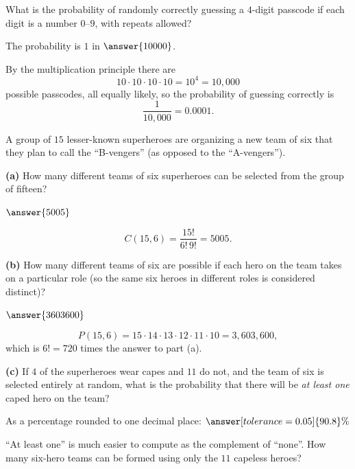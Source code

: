 \documentclass[12pt]{ximera}
\begin{document}
\begin{problem}
What is the probability of randomly correctly guessing a $4$-digit passcode if each
digit is a number $0$--$9$, with repeats allowed?

The probability is $1$ in $\answer{10000}$.

\begin{feedback}
By the multiplication principle there are
\[ 10\cdot 10\cdot 10\cdot 10 = 10^4 = 10{,}000 \]
possible passcodes, all equally likely, so the probability of guessing correctly is
\[ \frac{1}{10{,}000} = 0.0001. \]
\end{feedback}
\end{problem}

\begin{problem}
A group of $15$ lesser-known superheroes are organizing a new team of six that they
plan to call the ``B-vengers'' (as opposed to the ``A-vengers'').

\begin{prompt}
\textbf{(a)} How many different teams of six superheroes can be selected from the
group of fifteen?

$\answer{5005}$

\begin{feedback}
\[ C(15,6)=\frac{15!}{6!\,9!}=5005. \]
\end{feedback}
\end{prompt}

\begin{prompt}
\textbf{(b)} How many different teams of six are possible if each hero on the team
takes on a particular role (so the same six heroes in different roles is considered
distinct)?

$\answer{3603600}$

\begin{feedback}
\[ P(15,6)=15\cdot 14\cdot 13\cdot 12\cdot 11\cdot 10 = 3{,}603{,}600, \]
which is $6!=720$ times the answer to part (a).
\end{feedback}
\end{prompt}

\begin{prompt}
\textbf{(c)} If $4$ of the superheroes wear capes and $11$ do not, and the team of six
is selected entirely at random, what is the probability that there will be \emph{at
least one} caped hero on the team?

As a percentage rounded to one decimal place: $\answer[tolerance=0.05]{90.8}\%$

\begin{hint}
``At least one'' is much easier to compute as the complement of ``none''. How many
six-hero teams can be formed using only the $11$ capeless heroes?
\end{hint}


\end{prompt}
\end{problem}
\end{document}

